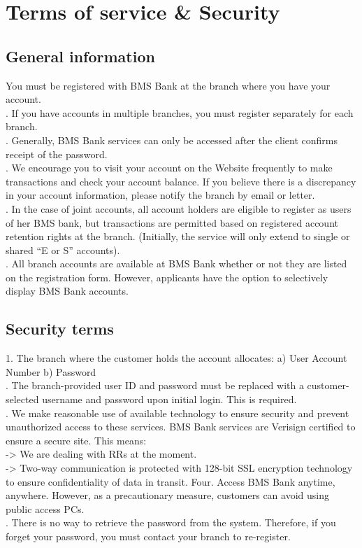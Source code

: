\documentclass{article}
\begin{document}
\newpage


\newpage
\section{Terms of service & Security }
\subsection{General information}
You must be registered with BMS Bank at the branch where you have your account. \\ \hfill {}. If you have accounts in multiple branches, you must register separately for each branch.\\ \hfill {}. Generally, BMS Bank services can only be accessed after the client confirms receipt of the password.\\ \hfill {}. We encourage you to visit your account on the Website frequently to make transactions and check your account balance. If you believe there is a discrepancy in your account information, please notify the branch by email or letter.\\ \hfill {}. In the case of joint accounts, all account holders are eligible to register as users of her BMS bank, but transactions are permitted based on registered account retention rights at the branch. (Initially, the service will only extend to single or shared “E or S” accounts).\\ \hfill {}. All branch accounts are available at BMS Bank whether or not they are listed on the registration form. However, applicants have the option to selectively display BMS Bank accounts.
\subsection{Security terms}
1. The branch where the customer holds the account allocates:
\hfill \break a) User Account Number \hfill \break  b) Password
\\ \hfill {}. The branch-provided user ID and password must be replaced with a customer-selected username and password upon initial login. This is required.\\ \hfill {}. We make reasonable use of available technology to ensure security and prevent unauthorized access to these services. BMS Bank services are Verisign certified to ensure a secure site. This means: \\-> We are dealing with RRs at the moment. \\-> Two-way communication is protected with 128-bit SSL encryption technology to ensure confidentiality of data in transit. Four. Access BMS Bank anytime, anywhere. However, as a precautionary measure, customers can avoid using public access PCs.
\\ \hfill {}. There is no way to retrieve the password from the system. Therefore, if you forget your password, you must contact your branch to re-register.
\end{document}
